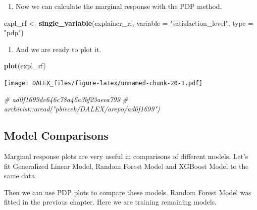 \documentclass[]{book}
\newenvironment{Shaded}{\begin{snugshade}}{\end{snugshade}}
\newcommand{\KeywordTok}[1]{\textcolor[rgb]{0.13,0.29,0.53}{\textbf{#1}}}
\newcommand{\DataTypeTok}[1]{\textcolor[rgb]{0.13,0.29,0.53}{#1}}
\newcommand{\StringTok}[1]{\textcolor[rgb]{0.31,0.60,0.02}{#1}}
\newcommand{\CommentTok}[1]{\textcolor[rgb]{0.56,0.35,0.01}{\textit{#1}}}
\newcommand{\NormalTok}[1]{#1}
\providecommand{\tightlist}{%
  \setlength{\itemsep}{0pt}\setlength{\parskip}{0pt}}
\theoremstyle{definition}
\theoremstyle{definition}
\theoremstyle{definition}
\theoremstyle{remark}
\begin{document}
\begin{enumerate}
\def\labelenumi{\arabic{enumi}.}
\setcounter{enumi}{2}
\tightlist
\item
  Now we can calculate the marginal response with the PDP method.
\end{enumerate}

\begin{Shaded}
\begin{Highlighting}[]
\NormalTok{expl_rf  <-}\StringTok{ }\KeywordTok{single_variable}\NormalTok{(explainer_rf, }\DataTypeTok{variable =}  \StringTok{"satisfaction_level"}\NormalTok{, }\DataTypeTok{type =} \StringTok{"pdp"}\NormalTok{)}
\end{Highlighting}
\end{Shaded}

\begin{enumerate}
\def\labelenumi{\arabic{enumi}.}
\setcounter{enumi}{3}
\tightlist
\item
  And we are ready to plot it.
\end{enumerate}

\begin{Shaded}
\begin{Highlighting}[]
\KeywordTok{plot}\NormalTok{(expl_rf)}
\end{Highlighting}
\end{Shaded}

\texttt{[image: DALEX\_files/figure-latex/unnamed-chunk-20-1.pdf]}

\begin{Shaded}
\begin{Highlighting}[]
\CommentTok{# ad0f1699de646c78a46a3bf23aeea799}
\CommentTok{# archivist::aread("pbiecek/DALEX/arepo/ad0f1699")}
\end{Highlighting}
\end{Shaded}

\subsection{Model Comparisons}\label{model-comparisons}

Marginal response plots are very useful in comparisons of different
models. Let's fit Generalized Linear Model, Random Forest Model and
XGBoost Model to the same data.

Then we can use PDP plots to compare these models. Random Forest Model
was fitted in the previous chapter. Here we are training remaining
models.
\end{document}
